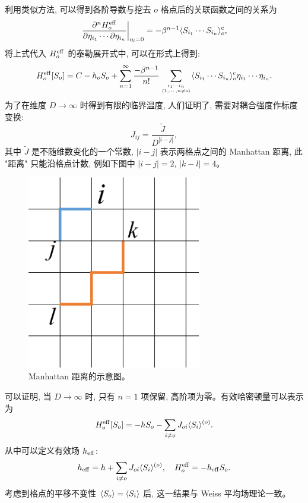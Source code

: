 利用类似方法, 可以得到各阶导数与挖去 $o$ 格点后的关联函数之间的关系为 
\begin{equation}
    \left. \frac{\partial^nH_{o}^{\mathrm{eff}}}{\partial\eta_{i_1}\cdots \partial\eta_{i_n}} \right|_{\eta_i=0}=-\beta^{n-1}\langle S_{i_1}\cdots S_{i_n} \rangle_o^{\mathrm{c}},
\end{equation}
将上式代入 $H_{o}^{\mathrm{eff}}$ 的泰勒展开式中, 可以在形式上得到: 
\begin{equation}
    H_{o}^{\mathrm{eff}} [S_o]=C-h_oS_o+\sum_{n=1}^{\infty}\frac{-\beta^{n-1}}{n!}\sum_{i_1\cdots i_n\atop (1,\cdots,n\ne o)}\langle S_{i_1}\cdots S_{i_n} \rangle_o^{\mathrm{c}}\eta_{i_1}\cdots \eta_{i_n}.
\end{equation} 
为了在维度 $D\to \infty$ 时得到有限的临界温度, 人们证明了, 需要对耦合强度作标度变换:
\begin{equation}
    J_{ij}=\frac{\tilde{J}}{D^{|i-j|}},
\end{equation}
其中 $\tilde{J}$ 是不随维数变化的一个常数, $|i-j|$ 表示两格点之间的 Manhattan 距离, 此 "距离" 只能沿格点计数, 例如下图中 $|i-j|=2$, $|k-l|=4$。
\begin{figure}[H]
    \vspace{13pt} %
    \centering
    \includegraphics[width=3in]{Img/manhattan.png}
    \caption{Manhattan 距离的示意图。} 
\end{figure}
可以证明, 当 $D\to \infty$ 时, 只有 $n=1$ 项保留, 高阶项为零。有效哈密顿量可以表示为
\begin{equation}
    H_{o}^{\mathrm{eff}} [S_o]= -h S_o-\sum_{i\ne o}J_{oi}\langle S_i \rangle^{(o)}.
\end{equation}
从中可以定义有效场 $h_{\mathrm{eff}}$:
\begin{equation}
    h_{\mathrm{eff}}=h+\sum_{i\ne o}J_{oi}\langle S_i \rangle^{(o)},\quad H_{o}^{\mathrm{eff}} =-h_{\mathrm{eff}}S_o.
\end{equation}
考虑到格点的平移不变性 $\langle S_o \rangle=\langle S_i \rangle$ 后, 这一结果与 Weiss 平均场理论一致。

